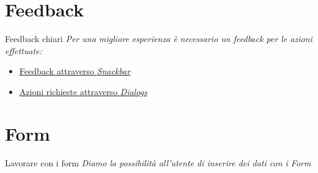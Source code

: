 \documentclass{../libs/presentation_format}
\begin{document}

\section{Feedback}
\begin{frame}{Feedback chiari}
	\emph{Per una migliore esperienza è necessario un feedback per le azioni effettuate:}
	\begin{itemize}
		\item \href{https://docs.flutter.dev/cookbook/design/snackbars}{Feedback attraverso \emph{Snackbar}}
		\item \href{https://api.flutter.dev/flutter/material/AlertDialog-class.html}{Azioni richieste attraverso \emph{Dialogs}}
	\end{itemize}
\end{frame}


\section{Form}
\begin{frame}{Lavorare con i form}
	\emph{Diamo la possibilità all'utente di inserire dei dati con i Form}
	\newline
	\centering
	\href{https://docs.flutter.dev/cookbook/forms/validation}{}
\end{frame}

\end{document}
